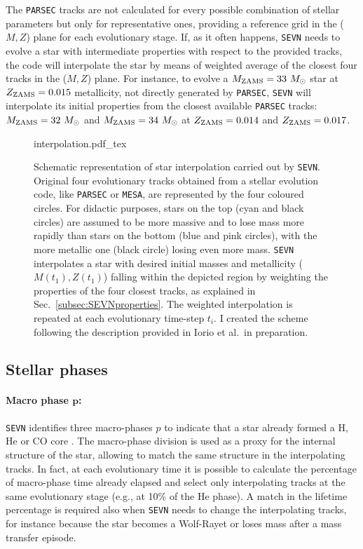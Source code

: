 \documentclass[a4paper,titlepage]{book}     	%
\newcommand{\sun}{\ensuremath{_\odot}}
\newcommand{\mzams}{M_\textup{ZAMS}}
\newcommand{\zzams}{Z_\textup{ZAMS}}
\newcommand{\msun}{\ensuremath{M\sun}}
\begin{document}
The \texttt{PARSEC} tracks are not calculated for every possible combination of stellar parameters but only for representative ones, providing a reference grid in the ($M,Z$) plane for each evolutionary stage. If, as it often happens, \texttt{SEVN} needs to evolve a star with intermediate properties with respect to the provided tracks, the code will interpolate the star by means of weighted average of the closest four tracks in the ($M,Z$) plane. For instance, to evolve a $\mzams = 33~\msun$ star at $\zzams=0.015$ metallicity, not directly generated by \texttt{PARSEC}, \texttt{SEVN} will interpolate its initial properties from the closest available \texttt{PARSEC} tracks: $\mzams = 32~\msun$ and $\mzams = 34~\msun$ at $\zzams = 0.014$ and $\zzams = 0.017$.


\begin{figure}
	\centering
	\def\svgwidth{0.5\textwidth}
	{interpolation.pdf_tex} 
	\caption{Schematic representation of star interpolation carried out by \texttt{SEVN}. Original four evolutionary tracks obtained from a stellar evolution code, like \texttt{PARSEC} or \texttt{MESA}, are represented by the four coloured circles. For didactic purposes, stars on the top (cyan and black circles) are assumed to be more massive and to lose mass more rapidly than stars on the bottom (blue and pink circles), with the more metallic one (black circle) losing even more mass. \texttt{SEVN} interpolates a star with desired initial masses and metallicity ($M(t_1),Z(t_1)$) falling within the depicted region by weighting the properties of the four closest tracks, as explained in Sec.\ \ref{subsec:SEVNproperties}. The weighted interpolation is repeated at each evolutionary time-step $t_i$. I created the scheme following the description provided in Iorio et al.\ in preparation.}\label{fig:SEVNinterpolation}
\end{figure}






\subsection{Stellar phases}\label{subsec:stellarphasesSEVN}
\paragraph{Macro phase $\boldsymbol{p}$:} \texttt{SEVN} identifies three macro-phases $p$ to indicate that a star already formed a H, He or CO core \cite{spera2019_mergingBBH}. The macro-phase division is used as a proxy for the internal structure of the star, allowing to match the same structure in the interpolating tracks. In fact, at each evolutionary time it is possible to calculate the percentage of macro-phase time already elapsed and select only interpolating tracks at the same evolutionary stage (e.g., at 10\% of the He phase). A match in the lifetime percentage is required also when \texttt{SEVN} needs to change the interpolating tracks, for instance because the star becomes a Wolf-Rayet or loses mass after a mass transfer episode. 
\end{document}
